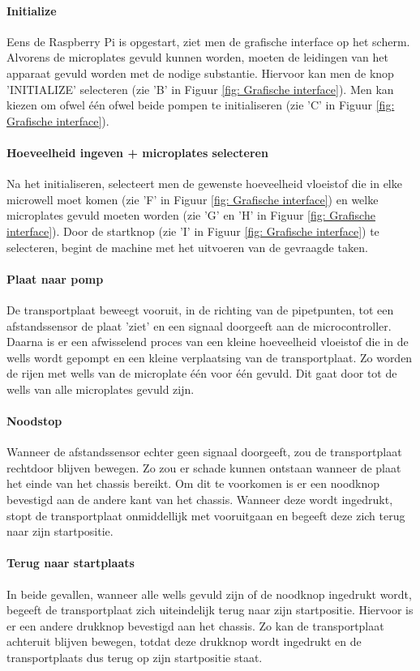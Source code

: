 \documentclass[a4paper,twoside,kulak]{kulakreport} %
\begin{document}
\paragraph{Initialize} 

Eens de Raspberry Pi is opgestart, ziet men de grafische interface op het scherm. Alvorens de microplates gevuld kunnen worden, moeten de leidingen van het apparaat gevuld worden met de nodige substantie. Hiervoor kan men de knop 'INITIALIZE' selecteren (zie 'B' in Figuur \ref{fig: Grafische interface}). Men kan kiezen om ofwel één ofwel beide pompen te initialiseren (zie 'C' in Figuur \ref{fig: Grafische interface}). 
\paragraph{Hoeveelheid ingeven + microplates selecteren}
Na het initialiseren, selecteert men de gewenste hoeveelheid vloeistof die in elke microwell moet komen (zie 'F' in Figuur \ref{fig: Grafische interface}) en welke microplates gevuld moeten worden (zie 'G' en 'H' in Figuur \ref{fig: Grafische interface}). Door de startknop (zie 'I' in Figuur \ref{fig: Grafische interface}) te selecteren, begint de machine met het uitvoeren van de gevraagde taken. 
\paragraph{Plaat naar pomp}
De transportplaat beweegt vooruit, in de richting van de pipetpunten, tot een afstandssensor de plaat 'ziet' en een signaal doorgeeft aan de microcontroller. Daarna is er een afwisselend proces van een kleine hoeveelheid vloeistof die in de wells wordt gepompt en een kleine verplaatsing van de transportplaat. Zo worden de rijen met wells van de microplate één voor één gevuld. Dit gaat door tot de wells van alle microplates gevuld zijn.
\paragraph{Noodstop}
Wanneer de afstandssensor echter geen signaal doorgeeft, zou de transportplaat rechtdoor blijven  bewegen. Zo zou er schade kunnen ontstaan wanneer de plaat het einde van het chassis bereikt. Om dit te voorkomen is er een noodknop bevestigd aan de andere kant van het chassis. Wanneer deze wordt ingedrukt, stopt de transportplaat onmiddellijk met vooruitgaan en begeeft deze zich terug naar  zijn startpositie. 
\paragraph{Terug naar startplaats}
In beide gevallen, wanneer alle wells gevuld zijn of de noodknop ingedrukt wordt, begeeft de transportplaat zich uiteindelijk terug naar zijn startpositie. Hiervoor is er een andere drukknop bevestigd aan het chassis. Zo kan de transportplaat achteruit blijven bewegen, totdat deze drukknop wordt ingedrukt en de transportplaats dus terug op zijn startpositie staat. 
\end{document}
